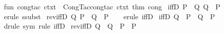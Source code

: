 \begin{isabellebody}
%
\endisadelimproof
%
\isadelimML
\isanewline
%
\endisadelimML
%
\isatagML
{}\isamarkupfalse%
\ {\isacartoucheopen}fun\ cong{\isacharunderscore}{\kern0pt}tac\ ctxt\ {\isacharequal}{\kern0pt}\ Cong{\isacharunderscore}{\kern0pt}Tac{\isachardot}{\kern0pt}cong{\isacharunderscore}{\kern0pt}tac\ ctxt\ {\isacharat}{\kern0pt}{\isacharbraceleft}{\kern0pt}thm\ cong{\isacharbraceright}{\kern0pt}{\isacartoucheclose}%
\endisatagML
{\isafoldML}%
%
\isadelimML
%
\endisadelimML
%
\isadelimdocument
%
\endisadelimdocument
%
\isatagdocument
%
\isamarkuptrue%
%
\endisatagdocument
{\isafolddocument}%
%
\isadelimdocument
%
\endisadelimdocument
{}\isamarkupfalse%
\ iffD{}{\isacharcolon}{\kern0pt}\ {\isachardoublequoteopen}{\isasymlbrakk}P\ {\isacharequal}{\kern0pt}\ Q{\isacharsemicolon}{\kern0pt}\ Q{\isasymrbrakk}\ {\isasymLongrightarrow}\ P{\isachardoublequoteclose}\isanewline
%
\isadelimproof
\ \ %
\endisadelimproof
%
\isatagproof
{}\isamarkupfalse%
\ {\isacharparenleft}{\kern0pt}erule\ ssubst{\isacharparenright}{\kern0pt}%
\endisatagproof
{\isafoldproof}%
%
\isadelimproof
\isanewline
%
\endisadelimproof
\isanewline
{}\isamarkupfalse%
\ rev{\isacharunderscore}{\kern0pt}iffD{}{\isacharcolon}{\kern0pt}\ {\isachardoublequoteopen}{\isasymlbrakk}Q{\isacharsemicolon}{\kern0pt}\ P\ {\isacharequal}{\kern0pt}\ Q{\isasymrbrakk}\ {\isasymLongrightarrow}\ P{\isachardoublequoteclose}\isanewline
%
\isadelimproof
\ \ %
\endisadelimproof
%
\isatagproof
{}\isamarkupfalse%
\ {\isacharparenleft}{\kern0pt}erule\ iffD{}{\isacharparenright}{\kern0pt}%
\endisatagproof
{\isafoldproof}%
%
\isadelimproof
\isanewline
%
\endisadelimproof
\isanewline
{}\isamarkupfalse%
\ iffD{}{\isacharcolon}{\kern0pt}\ {\isachardoublequoteopen}Q\ {\isacharequal}{\kern0pt}\ P\ {\isasymLongrightarrow}\ Q\ {\isasymLongrightarrow}\ P{\isachardoublequoteclose}\isanewline
%
\isadelimproof
\ \ %
\endisadelimproof
%
\isatagproof
{}\isamarkupfalse%
\ {\isacharparenleft}{\kern0pt}drule\ sym{\isacharparenright}{\kern0pt}\ {\isacharparenleft}{\kern0pt}rule\ iffD{}{\isacharparenright}{\kern0pt}%
\endisatagproof
{\isafoldproof}%
%
\isadelimproof
\isanewline
%
\endisadelimproof
\isanewline
{}\isamarkupfalse%
\ rev{\isacharunderscore}{\kern0pt}iffD{}{\isacharcolon}{\kern0pt}\ {\isachardoublequoteopen}Q\ {\isasymLongrightarrow}\ Q\ {\isacharequal}{\kern0pt}\ P\ {\isasymLongrightarrow}\ P{\isachardoublequoteclose}\isanewline

\end{isabellebody}
